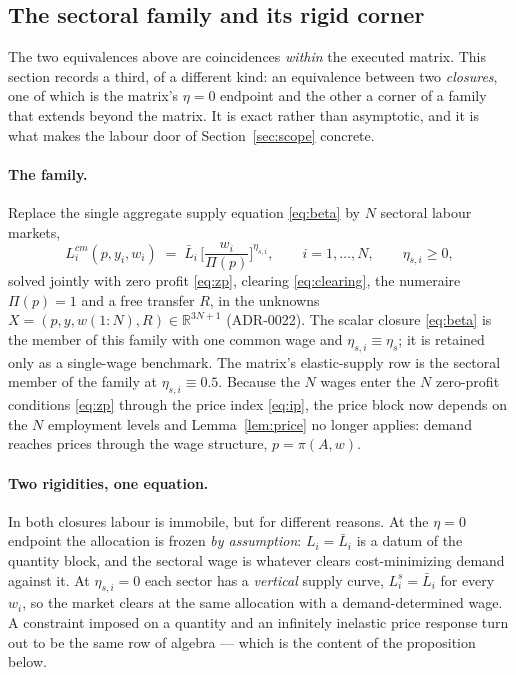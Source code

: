 \subsection{The sectoral family and its rigid corner}\label{sec:sectoral}

The two equivalences above are coincidences \emph{within} the executed matrix.
This section records a third, of a different kind: an equivalence between two
\emph{closures}, one of which is the matrix's $\eta = 0$ endpoint and the other
a corner of a family that extends beyond the matrix. It is exact rather than
asymptotic, and it is what makes the labour door of Section~\ref{sec:scope}
concrete.

\paragraph{The family.} Replace the single aggregate supply equation
\eqref{eq:beta} by $N$ sectoral labour markets,
\begin{equation}
L^{cm}_i(p, y_i, w_i) \;=\; \bar{L}_i\,
   \Big[ \frac{w_i}{\Pi(p)} \Big]^{\eta_{s,i}},
\qquad i = 1, \dots, N, \qquad \eta_{s,i} \geq 0,
\label{eq:etas}
\end{equation}
solved jointly with zero profit \eqref{eq:zp}, clearing \eqref{eq:clearing},
the numeraire $\Pi(p) = 1$ and a free transfer $R$, in the unknowns
$X = (p, y, w(1{:}N), R) \in \mathbb{R}^{3N+1}$ (ADR-0022). The scalar closure
\eqref{eq:beta} is the member of this family with one common wage and
$\eta_{s,i} \equiv \eta_s$; it is retained only as a single-wage benchmark.
The matrix's elastic-supply row is the sectoral member of the family at
$\eta_{s,i} \equiv 0.5$. Because the $N$
wages enter the $N$ zero-profit conditions \eqref{eq:zp} through the price
index \eqref{eq:ip}, the price block now depends on the $N$ employment levels
and Lemma~\ref{lem:price} no longer applies: demand reaches prices through the
wage structure, $p = \pi(A, w)$.

\paragraph{Two rigidities, one equation.} In both closures labour is immobile,
but for different reasons. At the $\eta = 0$ endpoint the allocation is frozen
\emph{by assumption}: $L_i = \bar{L}_i$ is a datum of the quantity block, and
the sectoral wage is whatever clears cost-minimizing demand against it. At
$\eta_{s,i} = 0$ each sector has a \emph{vertical} supply curve,
$L^s_i = \bar{L}_i$ for every $w_i$, so the market clears at the same
allocation with a demand-determined wage. A constraint imposed on a quantity
and an infinitely inelastic price response turn out to be the same row of
algebra --- which is the content of the proposition below.

